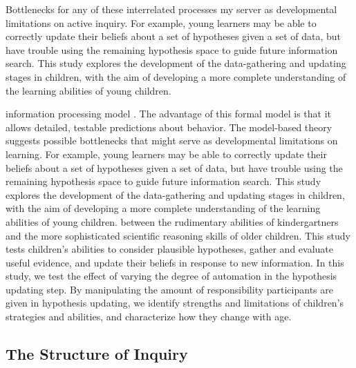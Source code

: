 \documentclass[10pt,letterpaper]{article}
\begin{document}
Bottlenecks for any of these interrelated processes my server as developmental 
limitations on active inquiry.  For example, young learners may be able to correctly 
update their beliefs about a set of hypotheses given a set of data, but have trouble 
using the remaining hypothesis space to guide future information search. This study 
explores the development of the data-gathering and updating stages in children, with 
the aim of developing a more complete understanding of the learning abilities of 
young children.


information processing model \cite{Gureckis:2012,Gureckis:2009,Markant:2012}. 
The advantage of this formal model is that it allows detailed, testable predictions 
about behavior. The model-based theory suggests possible bottlenecks that might 
serve as developmental limitations on learning. For example, young learners may be 
able to correctly update their beliefs about a set of hypotheses given a set of data, 
but have trouble using the remaining hypothesis space to guide future information 
search. This study explores the development of the data-gathering and updating 
stages in children, with the aim of developing a more complete understanding of the 
learning abilities of young children.
%
between the rudimentary abilities of kindergartners and the more sophisticated 
scientific reasoning skills of older children. This study tests children's abilities to 
consider plausible hypotheses, gather and evaluate useful evidence, and update 
their beliefs in response to new information. In this study, we test the effect of 
varying the degree of automation in the hypothesis updating step. By manipulating 
the amount of responsibility participants are given in hypothesis updating, we 
identify strengths and limitations of children's strategies and abilities, and 
characterize how they change with age. 

\subsection{The Structure of Inquiry}
\end{document}
